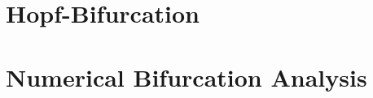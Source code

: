\documentclass{beamer}
\begin{document}
\section{Hopf-Bifurcation}


\section{Numerical Bifurcation Analysis}
\end{document}
